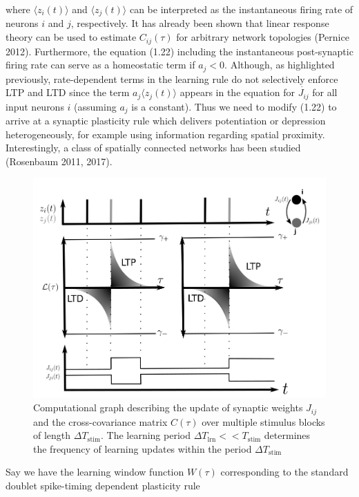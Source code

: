 \documentclass{ucetd}
\begin{document}
where $\langle z_{i}(t)\rangle$ and $\langle z_{j}(t)\rangle$ can be interpreted as the instantaneous firing rate of neurons $i$ and $j$, respectively. It has already been shown that linear response theory can be used to estimate $C_{ij}(\tau)$ for arbitrary network topologies (Pernice 2012). Furthermore, the equation (1.22) including the instantaneous post-synaptic firing rate can serve as a homeostatic term if $a_{j} < 0$. Although, as highlighted previously, rate-dependent terms in the learning rule do not selectively enforce LTP and LTD since the term $a_{j}\langle z_{j}(t)\rangle$ appears in the equation for $\dot{J_{ij}}$ for all input neurons $i$ (assuming $a_{j}$ is a constant). Thus we need to modify (1.22) to arrive at a synaptic plasticity rule which delivers potentiation or depression heterogeneously, for example using information regarding spatial proximity. Interestingly, a class of spatially connected networks has been studied (Rosenbaum 2011, 2017).


\begin{figure}[t!]
\centering
\includegraphics[width=150mm]{figure-2}
\caption{Computational graph describing the update of synaptic weights $J_{ij}$ and the cross-covariance matrix $C(\tau)$ over multiple stimulus blocks of length $\Delta T_{\mathrm{stim}}$. The learning period $\Delta T_{\mathrm{lrn}}<< T_{\mathrm{stim}}$ determines the frequency of learning updates within the period $\Delta T_{\mathrm{stim}}$}
\end{figure}

Say we have the learning window function $W(\tau)$ corresponding to the standard doublet spike-timing dependent plasticity rule
\end{document}
